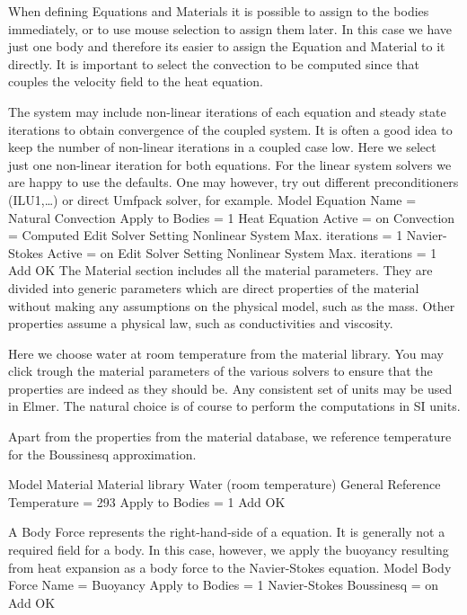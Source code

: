 When defining Equations and Materials it is possible to assign to the bodies immediately, or to use mouse
selection to assign them later. In this case we have just one body and therefore its easier to assign 
the Equation and Material to it directly.
It is important to select the 
convection to be computed since that couples the velocity field to the heat equation.

The system may include non-linear iterations of each equation and steady state iterations 
to obtain convergence of the coupled system. It is often a good idea to keep the number of 
non-linear iterations in a coupled case low. Here we select just one non-linear iteration
for both equations.
For the linear system solvers we are happy to use the defaults. One may however, try out different
preconditioners (ILU1,\ldots) or direct Umfpack solver, for example.
\ttbegin
Model
  Equation
    Name = Natural Convection
    Apply to Bodies = 1
    Heat Equation
      Active = on
      Convection = Computed
      Edit Solver Setting
        Nonlinear System
          Max. iterations = 1
    Navier-Stokes 
      Active = on
      Edit Solver Setting
        Nonlinear System
          Max. iterations = 1
    Add 
    OK
\ttend        
The Material section includes all the material parameters.
They are divided into generic parameters which are direct properties of the material
without making any assumptions on the physical model, such as the mass. Other properties assume
a physical law, such as conductivities and viscosity. 

Here we choose water at room temperature from the material library.
You may click trough the material parameters of the various solvers to ensure that
the properties are indeed as they should be. Any consistent set of units may be used in Elmer.
The natural choice is of course to perform the computations in SI units. 

Apart from the properties from the material database, we
reference temperature for the Boussinesq approximation.    

\ttbegin
Model
  Material
    Material library    
      Water (room temperature)
    General 
      Reference Temperature = 293
    Apply to Bodies = 1 
    Add
    OK
\ttend

A Body Force represents the right-hand-side of a equation. It is generally 
not a required field for a body. In this case, however, we apply the buoyancy resulting from
heat expansion as a body force to the Navier-Stokes equation.
\ttbegin
Model
  Body Force
    Name = Buoyancy
    Apply to Bodies = 1
    Navier-Stokes
      Boussinesq = on
    Add 
    OK
\ttend    


